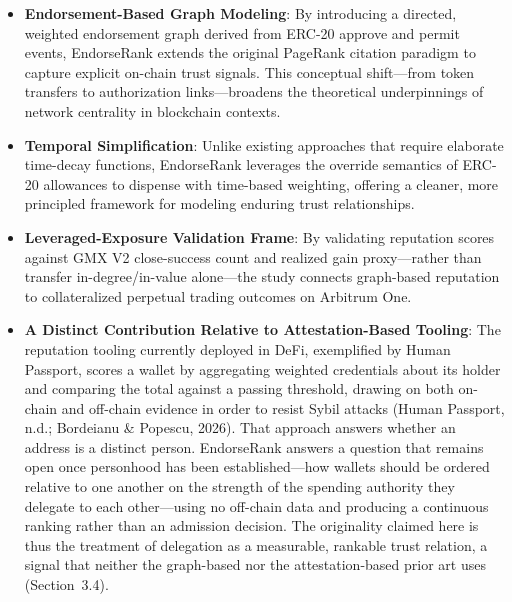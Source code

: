 \begin{itemize}
\item[\textbullet] \textbf{Endorsement-Based Graph Modeling}: By introducing a directed, weighted endorsement graph derived from ERC-20 approve and permit events, EndorseRank extends the original PageRank citation paradigm to capture explicit on-chain trust signals. This conceptual shift---from token transfers to authorization links---broadens the theoretical underpinnings of network centrality in blockchain contexts.
\item[\textbullet] \textbf{Temporal Simplification}: Unlike existing approaches that require elaborate time-decay functions, EndorseRank leverages the override semantics of ERC-20 allowances to dispense with time-based weighting, offering a cleaner, more principled framework for modeling enduring trust relationships.
\item[\textbullet] \textbf{Leveraged-Exposure Validation Frame}: By validating reputation scores against GMX V2 close-success count and realized gain proxy---rather than transfer in-degree/in-value alone---the study connects graph-based reputation to collateralized perpetual trading outcomes on Arbitrum One.
\item[\textbullet] \textbf{A Distinct Contribution Relative to Attestation-Based Tooling}: The reputation tooling currently deployed in DeFi, exemplified by Human Passport, scores a wallet by aggregating weighted credentials about its holder and comparing the total against a passing threshold, drawing on both on-chain and off-chain evidence in order to resist Sybil attacks (Human Passport, n.d.; Bordeianu \& Popescu, 2026). That approach answers whether an address is a distinct person. EndorseRank answers a question that remains open once personhood has been established---how wallets should be ordered relative to one another on the strength of the spending authority they delegate to each other---using no off-chain data and producing a continuous ranking rather than an admission decision. The originality claimed here is thus the treatment of delegation as a measurable, rankable trust relation, a signal that neither the graph-based nor the attestation-based prior art uses (Section~3.4).
\end{itemize}

